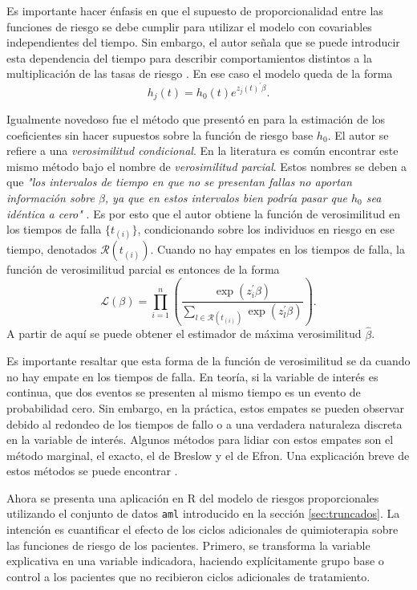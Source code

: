 \documentclass[11pt,a4paper]{article}
\begin{document}
Es importante hacer énfasis en que el supuesto de proporcionalidad entre las funciones de riesgo se debe cumplir para utilizar el modelo con covariables independientes del tiempo. Sin embargo, el autor señala que se puede introducir esta dependencia del tiempo para describir comportamientos distintos a la multiplicación de las tasas de riesgo \citep{cox}. En ese caso el modelo queda de la forma
\begin{equation*}
h_j(t) = h_0(t)e^{z_j(t)^\prime \beta}.
\end{equation*}

Igualmente novedoso fue el método que presentó en \citet{cox} para la estimación de los coeficientes sin hacer supuestos sobre la función de riesgo base $h_0$. El autor se refiere a una \textit{verosimilitud condicional}. En la literatura es común encontrar este mismo método bajo el nombre de \textit{verosimilitud parcial}. Estos nombres se deben a que \textit{"los intervalos de tiempo en que no se presentan fallas no aportan información sobre $\beta$, ya que en estos intervalos bien podría pasar que $h_0$ sea idéntica a cero"} \citep{cox}. Es por esto que el autor obtiene la función de verosimilitud en los tiempos de falla $\lbrace t_{(i)} \rbrace$, condicionando sobre los individuos en riesgo en ese tiempo, denotados $\mathcal{R}(t_{(i)})$. Cuando no hay empates en los tiempos de falla, la función de verosimilitud parcial es entonces de la forma
$$\mathcal{L}(\beta) = \prod_{i=1}^n \left(\frac{\exp (z_i^\prime \beta)}{\sum_{l\in \mathcal{R}(t_{(i)})}\exp (z_l^\prime \beta)}\right).$$ A partir de aquí se puede obtener el estimador de máxima verosimilitud $\hat{\beta}$.

Es importante resaltar que esta forma de la función de verosimilitud se da cuando no hay empate en los tiempos de falla. En teoría, si la variable de interés es continua, que dos eventos se presenten al mismo tiempo es un evento de probabilidad cero. Sin embargo, en la práctica, estos empates se pueden observar debido al redondeo de los tiempos de fallo o a una verdadera naturaleza discreta en la variable de interés. Algunos métodos para lidiar con estos empates son el método marginal, el exacto, el de Breslow y el de Efron. Una explicación breve de estos métodos se puede encontrar \citet{moore}.

Ahora se presenta una aplicación en R del modelo de riesgos proporcionales utilizando el conjunto de datos \texttt{aml} introducido en la sección \ref{sec:truncados}. La intención es cuantificar el efecto de los ciclos adicionales de quimioterapia sobre las funciones de riesgo de los pacientes. Primero, se transforma la variable explicativa en una variable indicadora, haciendo explícitamente grupo base o control a los pacientes que no recibieron ciclos adicionales de tratamiento.
\end{document}
